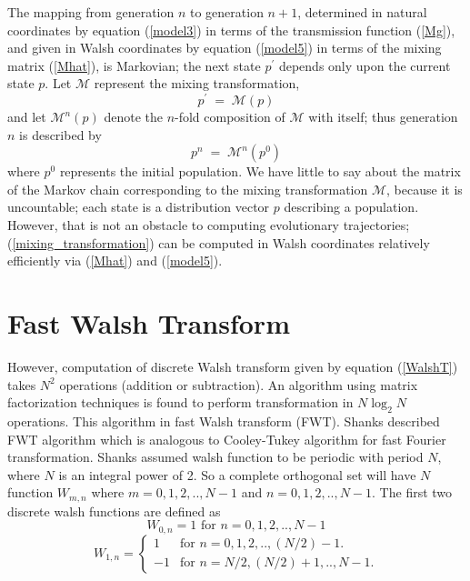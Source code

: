 The mapping from generation $n$ to generation $n+1$, determined in
natural coordinates by equation (\ref{model3}) in terms of the
transmission function (\ref{Mg}), and given in Walsh coordinates by
equation (\ref{model5}) in terms of the mixing matrix (\ref{Mhat}), is
Markovian; the next state $p^\prime$ depends only upon the current
state $p$.  Let $\mathcal{M}$ represent the mixing transformation,
\begin{equation} \label{mixing_transformation}
p^\prime \; = \; \mathcal{M}(p)
\end{equation}
and let $\mathcal{M}^n(p)$ denote the $n$-fold composition of
$\mathcal{M}$ with itself; thus generation $n$ is described by
\[
p^n \; = \; \mathcal{M}^n(p^0)
\]
where $p^0$ represents the initial population.  We have little to say
about the matrix of the Markov chain corresponding to the mixing
transformation $\mathcal{M}$, because it is uncountable; each state is
a distribution vector $p$ describing a population. However, that is
not an obstacle to computing evolutionary trajectories;
(\ref{mixing_transformation}) can be computed in Walsh coordinates
relatively efficiently via (\ref{Mhat}) and (\ref{model5}).

\section{Fast Walsh Transform}
However, computation of discrete Walsh transform given by equation (\ref{WalshT}) takes $N^2$ operations (addition or subtraction).
An algorithm using matrix factorization techniques is found to perform transformation in $N \log_2 N$ operations.
This algorithm in fast Walsh transform (FWT). 
Shanks \cite{Shanks1969} described FWT algorithm which is analogous to Cooley-Tukey \cite{CooleyTukey1965} algorithm for fast Fourier transformation. Shanks assumed walsh function to be periodic with period $N$, where $N$ is an integral power of 2. So a complete orthogonal set will have $N$ function $W_{m,n}$ where $m = 0, 1, 2,.., N-1$ and $n = 0, 1, 2,.., N-1$. The first two discrete walsh functions are defined as 
\begin{equation}
\label{FWT1}
W_{0,n} = 1    \text{ for $n = 0, 1, 2,.., N-1$}
\end{equation}
\begin{equation}
\label{FWT2}
W_{1,n} = \begin{cases}
    1 & \text{for $n = 0, 1, 2,.., (N/2)-1$}.\\
    -1 & \text{for $n = N/2, (N/2)+1,.., N-1$}.
  \end{cases}
\end{equation}

